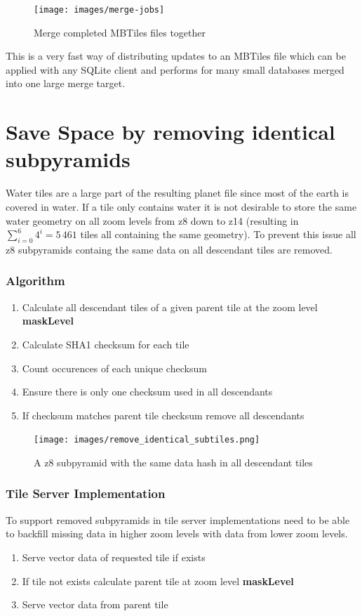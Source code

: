 \begin{figure}[H]
  \centering
  \texttt{[image: images/merge-jobs]}
  \caption{Merge completed MBTiles files together}
\end{figure}

This is a very fast way of distributing updates to an MBTiles file which can be applied with any SQLite client and performs for many small databases merged into one large merge target.

\section{Save Space by removing identical subpyramids}

Water tiles are a large part of the resulting planet file since most of the earth is covered in water.
If a tile only contains water it is not desirable to store the same water geometry on all zoom levels
from z8 down to z14 (resulting in $\sum_{i=0}^{6} 4^i = 5\,461$ tiles all containing the same geometry).
To prevent this issue all z8 subpyramids containg the same data on all descendant tiles are removed.

\subsubsection*{Algorithm}

\begin{enumerate}  
    \item Calculate all descendant tiles of a given parent tile at the zoom level \textbf{maskLevel}
    \item Calculate SHA1 checksum for each tile
    \item Count occurences of each unique checksum
    \item Ensure there is only one checksum used in all descendants
    \item If checksum matches parent tile checksum remove all descendants
\end{enumerate}


\begin{figure}[H]
  \centering
  \texttt{[image: images/remove\_identical\_subtiles.png]}
  \caption{A z8 subpyramid with the same data hash in all descendant tiles}
\end{figure}

\subsubsection*{Tile Server Implementation}

To support removed subpyramids in tile server implementations need to be able to backfill missing data in higher zoom levels with data from lower zoom levels.

\begin{enumerate}  
    \item Serve vector data of requested tile if exists
    \item If tile not exists calculate parent tile at zoom level \textbf{maskLevel}
    \item Serve vector data from parent tile
\end{enumerate}